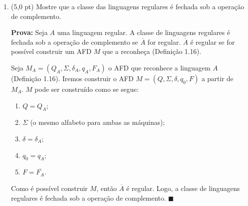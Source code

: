 \documentclass[12pt,a4paper,oneside]{article}
\begin{document}
\begin{enumerate}
	\newpage
	\item (5,0 pt) Mostre que a classe das linguagens regulares é fechada sob a operação de complemento.\\
	{\color{verde}
	{\bf Prova:} Seja $A$ uma linguagem regular. A classe de linguagens regulares é fechada sob a operação de complemento se $\overline{A}$ for regular. $\overline{A}$ é regular se for possível construir um AFD $M$ que a reconheça (Definição 1.16).

Seja $M_A = ( Q_A, \Sigma, \delta_A, q_A, F_A )$ o AFD que reconhece a linguagem $A$ (Definição 1.16). Iremos construir o AFD $M = ( Q, \Sigma, \delta, q_0, F )$ a partir de $M_A$. $M$ pode ser construído como se segue:

\begin{enumerate}
	\item $Q = Q_A$;
	\item $\Sigma$ (o mesmo alfabeto para ambas as máquinas);
	\item $\delta = \delta_A$;
	\item $q_0 = q_A$;
	\item $F = \overline{F_A}$.
\end{enumerate}

Como é possível construir $M$, então $\overline{A}$ é regular. Logo, a classe de linguagens regulares é fechada sob a operação de complemento. $\blacksquare$
	}
	
\end{enumerate}
\end{document}
